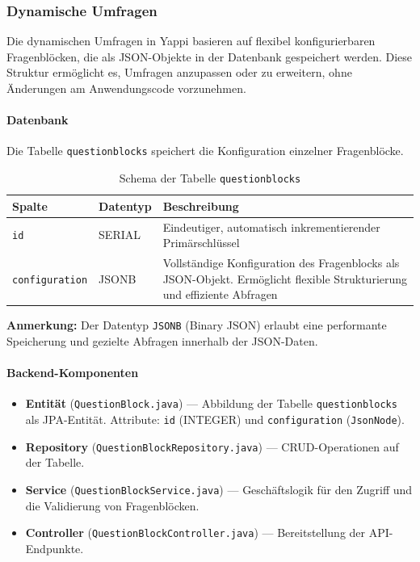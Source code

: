 \documentclass[12pt,a4paper]{report}
\begin{document}
\subsubsection{Dynamische Umfragen}

Die dynamischen Umfragen in Yappi basieren auf flexibel konfigurierbaren Fragenblöcken, die als JSON-Objekte in der Datenbank gespeichert werden.
Diese Struktur ermöglicht es, Umfragen anzupassen oder zu erweitern, ohne Änderungen am Anwendungscode vorzunehmen.

\paragraph{Datenbank}
Die Tabelle \texttt{questionblocks} speichert die Konfiguration einzelner Fragenblöcke.

\begin{table}[!htbp]
\centering
\begin{tabular}{|l|l|p{9cm}|}
\hline
\textbf{Spalte} & \textbf{Datentyp} & \textbf{Beschreibung} \\
\hline
\texttt{id} & SERIAL & Eindeutiger, automatisch inkrementierender Primärschlüssel \\
\texttt{configuration} & JSONB & Vollständige Konfiguration des Fragenblocks als JSON-Objekt.
Ermöglicht flexible Strukturierung und effiziente Abfragen \\
\hline
\end{tabular}
\caption{Schema der Tabelle \texttt{questionblocks}}
\label{tab:questionblocks_schema}
\end{table}

\noindent
\textbf{Anmerkung:} Der Datentyp \texttt{JSONB} (Binary JSON) erlaubt eine performante Speicherung und gezielte Abfragen innerhalb der JSON-Daten.

\paragraph{Backend-Komponenten}
\begin{itemize}
  \item \textbf{Entität} (\texttt{QuestionBlock.java}) — Abbildung der Tabelle \texttt{questionblocks} als JPA-Entität.
        Attribute: \texttt{id} (INTEGER) und \texttt{configuration} (\texttt{JsonNode}).
  \item \textbf{Repository} (\texttt{QuestionBlockRepository.java}) — CRUD-Operationen auf der Tabelle.
  \item \textbf{Service} (\texttt{QuestionBlockService.java}) — Geschäftslogik für den Zugriff und die Validierung von Fragenblöcken.
  \item \textbf{Controller} (\texttt{QuestionBlockController.java}) — Bereitstellung der API-Endpunkte.
\end{itemize}
\end{document}
